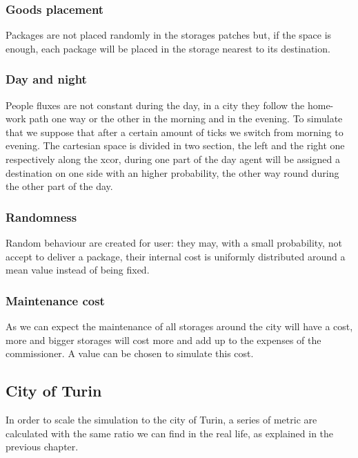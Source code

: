 \documentclass[11pt,a4paper]{article}
\begin{document}
\subsubsection*{Goods placement}
Packages are not placed randomly in the storages patches but, if the space is enough, each package will be placed in the storage nearest to its destination.

\begin{figure}[h!]
\centering
\end{figure}
\newpage
\subsubsection*{Day and night}
People fluxes are not constant during the day, in a city they follow the home-work path one way or the other in the morning and in the evening.
To simulate that we suppose that after a certain amount of ticks we switch from morning to evening.
The cartesian space is divided in two section, the left and the right one respectively along the xcor, during one part of the day agent will be assigned a destination on one side with an higher probability, the other way round during the other part of the day.

\begin{figure}[h!]
\centering
\end{figure}

\subsubsection*{Randomness}
Random behaviour are created for user: they may, with a small probability, not accept to deliver a package, their internal cost is uniformly distributed around a mean value instead of being fixed.

\subsubsection*{Maintenance cost}
As we can expect the maintenance of all storages around the city will have a cost, more and bigger storages will cost more and add up to the expenses of the commissioner. A value can be chosen to simulate this cost.

\subsection{City of Turin}
In order to scale the simulation to the city of Turin, a series of metric are calculated with the same ratio we can find in the real life, as explained in the previous chapter.
\end{document}
